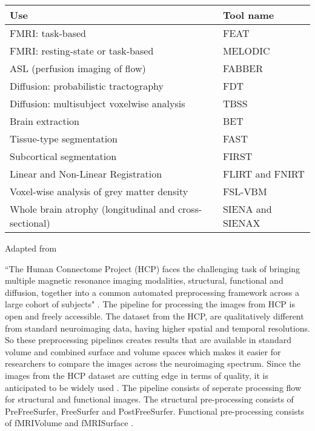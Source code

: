 \begin{center}
\tabulinesep=1.2mm
\begin{tabu} to \textwidth { | X[l] | X[l] | }
  \hline
  Use & Tool name \\
  \hline
  FMRI: task-based & FEAT \\
  \hline
  FMRI: resting-state or task-based & MELODIC \\
  \hline
  ASL (perfusion imaging of flow) & FABBER \\
  \hline
  Diffusion: probabilistic tractography & FDT \\
  \hline
  Diffusion: multisubject voxelwise analysis & TBSS \\
  \hline
  Brain extraction & BET \\
  \hline
  Tissue-type segmentation  & FAST \\
  \hline
  Subcortical segmentation & FIRST \\
  \hline
  Linear and Non-Linear Registration & FLIRT and FNIRT \\
  \hline
  Voxel-wise analysis of grey matter density & FSL-VBM \\
  \hline
  Whole brain atrophy (longitudinal and cross-sectional) & SIENA and SIENAX \\
  \hline
\end{tabu}
\label{tab:tools_fsl}
\caption*{Adapted from \cite{JENKINSON2012782}}
\end{center}

``The Human Connectome Project (HCP) faces the challenging task of bringing multiple magnetic resonance imaging modalities, structural, functional and diffusion, together into a common automated preprocessing framework across a large cohort of subjects" \cite{Gla13}. The pipeline for processing the images from HCP is open and freely accessible. The dataset from the HCP, are qualitatively different from standard neuroimaging data, having higher spatial and temporal resolutions. So these preprocessing pipelines creates results that are available in standard volume and combined surface and volume spaces which makes it easier for researchers to compare the images across the neuroimaging spectrum. Since the images from the HCP dataset are cutting edge in terms of quality, it is anticipated to be widely used \cite{HODGE20161102}. The pipeline consists of seperate processing flow for structural and functional images. The structural pre-processing consists of PreFreeSurfer, FreeSurfer and PostFreeSurfer. Functional pre-processing consists of fMRIVolume and fMRISurface \cite{FSL}.


